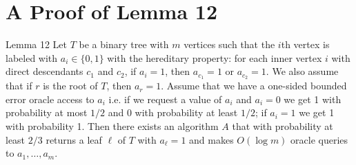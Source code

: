 \section*{A Proof of Lemma 12}
\begin{authorclaim}{Lemma 12}
Let $T$ be a binary tree with $m$ vertices such that the $i$th vertex is labeled with $a_i\in\{0,1\}$ with the hereditary property: for each inner vertex $i$ with direct descendants $c_1$ and $c_2$, if $a_i=1$, then $a_{c_1}=1$ or $a_{c_2}=1$. We also assume that if $r$ is the root of $T$, then $a_r=1$. Assume that we have a one-sided bounded error oracle access to $a_i$ i.e. if we request a value of $a_i$ and $a_i=0$ we get 1 with probability at most $1/2$ and 0 with probability at least $1/2$; if $a_i=1$ we get 1 with probability 1. Then there exists an algorithm $A$ that with probability at least $2/3$ returns a leaf $\ell$ of $T$ with $a_\ell=1$ and makes $O(\log m)$ oracle queries to $a_1,\ldots,a_m$.
\end{authorclaim}
